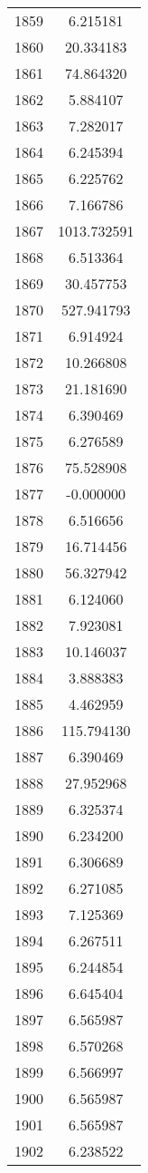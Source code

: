 \documentclass[12pt]{article}
\begin{document}
\begin{longtable}{@{}cc@{}}
1859 & 6.215181 \\
1860 & 20.334183 \\
1861 & 74.864320 \\
1862 & 5.884107 \\
1863 & 7.282017 \\
1864 & 6.245394 \\
1865 & 6.225762 \\
1866 & 7.166786 \\
1867 & 1013.732591 \\
1868 & 6.513364 \\
1869 & 30.457753 \\
1870 & 527.941793 \\
1871 & 6.914924 \\
1872 & 10.266808 \\
1873 & 21.181690 \\
1874 & 6.390469 \\
1875 & 6.276589 \\
1876 & 75.528908 \\
1877 & -0.000000 \\
1878 & 6.516656 \\
1879 & 16.714456 \\
1880 & 56.327942 \\
1881 & 6.124060 \\
1882 & 7.923081 \\
1883 & 10.146037 \\
1884 & 3.888383 \\
1885 & 4.462959 \\
1886 & 115.794130 \\
1887 & 6.390469 \\
1888 & 27.952968 \\
1889 & 6.325374 \\
1890 & 6.234200 \\
1891 & 6.306689 \\
1892 & 6.271085 \\
1893 & 7.125369 \\
1894 & 6.267511 \\
1895 & 6.244854 \\
1896 & 6.645404 \\
1897 & 6.565987 \\
1898 & 6.570268 \\
1899 & 6.566997 \\
1900 & 6.565987 \\
1901 & 6.565987 \\
1902 & 6.238522 \\

\end{longtable}
\end{document}

